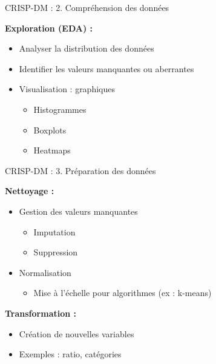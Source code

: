 \begin{frame}{CRISP-DM : 2. Compréhension des données}

\textbf{Exploration (EDA) :}

\vspace{0.3cm}

\begin{itemize}
    \item<+-> Analyser la distribution des données
    \item<+-> Identifier les valeurs manquantes ou aberrantes
    \item<+-> Visualisation : graphiques
        \begin{itemize}
            \item Histogrammes
            \item Boxplots
            \item Heatmaps
        \end{itemize}
\end{itemize}

\end{frame}

\begin{frame}{CRISP-DM : 3. Préparation des données}

\textbf{Nettoyage :}

\vspace{0.3cm}

\begin{itemize}
    \item<+-> Gestion des valeurs manquantes
        \begin{itemize}
            \item Imputation
            \item Suppression
        \end{itemize}

    \vspace{0.2cm}
    \item<+-> Normalisation
        \begin{itemize}
            \item Mise à l'échelle pour algorithmes (ex : k-means)
        \end{itemize}
\end{itemize}

\vspace{0.3cm}

\textbf{Transformation :}
\begin{itemize}
    \item Création de nouvelles variables
    \item Exemples : ratio, catégories
\end{itemize}

\end{frame}

